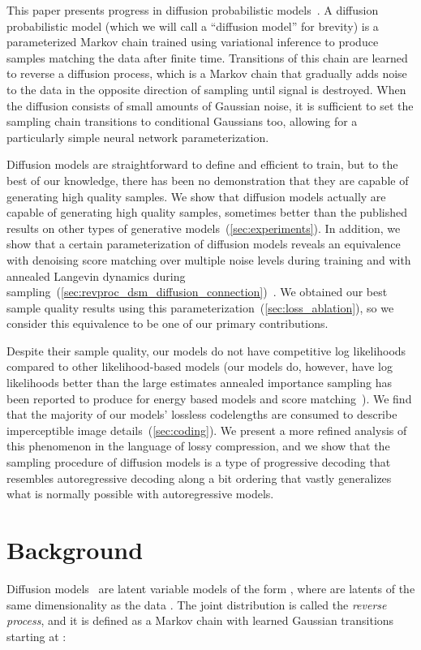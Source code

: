 \documentclass{article}
\begin{document}
This paper presents progress in diffusion probabilistic models~\citep{sohl2015deep}. A diffusion probabilistic model (which we will call a ``diffusion model'' for brevity) is a parameterized Markov chain trained using variational inference to produce samples matching the data after finite time. Transitions of this chain are learned to reverse a diffusion process, which is a Markov chain that gradually adds noise to the data in the opposite direction of sampling until signal is destroyed.
When the diffusion consists of small amounts of Gaussian noise, it is sufficient to set the sampling chain transitions to conditional Gaussians too, allowing for a particularly simple neural network parameterization.

Diffusion models are straightforward to define and efficient to train, but to the best of our knowledge, there has been no demonstration that they are capable of generating high quality samples. We show that diffusion models actually are capable of generating high quality samples, sometimes better than the published results on other types of generative models~(\cref{sec:experiments}).
In addition, we show that a certain parameterization of diffusion models reveals an equivalence with denoising score matching over multiple noise levels during training and with annealed Langevin dynamics during sampling~(\cref{sec:revproc_dsm_diffusion_connection})~\citep{song2019generative,vincent2011connection}. 
We obtained our best sample quality results using this parameterization~(\cref{sec:loss_ablation}), so we consider this equivalence to be one of our primary contributions.

Despite their sample quality, our models do not have competitive log likelihoods compared to other likelihood-based models (our models do, however, have log likelihoods better than the large estimates annealed importance sampling has been reported to produce for energy based models and score matching~\citep{du2019implicit,song2019generative}).
We find that the majority of our models' lossless codelengths  are consumed to describe imperceptible image details~(\cref{sec:coding}). We present a more refined analysis of this phenomenon in the language of lossy compression, and we show that the sampling procedure of diffusion models is a type of progressive decoding that resembles autoregressive decoding along a bit ordering that vastly generalizes what is normally possible with autoregressive models.


\section{Background}
Diffusion models~\citep{sohl2015deep} are latent variable models of the form , where  are latents of the same dimensionality as the data . The joint distribution  is called the \emph{reverse process}, and it is defined as a Markov chain with learned Gaussian transitions starting at :
\end{document}
